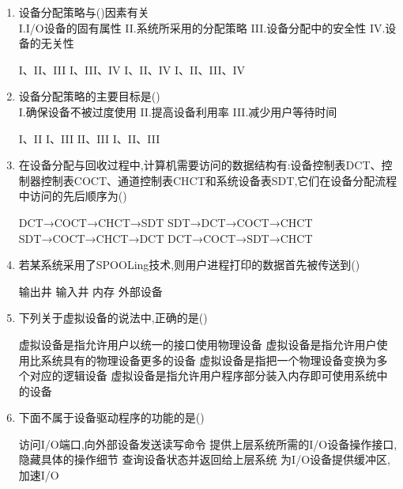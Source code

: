 \documentclass[12pt, a4paper, oneside, UTF8]{ctexbook}
\begin{document}
\begin{enumerate}
    \item 设备分配策略与(\qquad)因素有关\\
    I.I/O设备的固有属性\quad
    II.系统所采用的分配策略\quad
    III.设备分配中的安全性\quad
    IV.设备的无关性
    \begin{choices}[2]
    \task I、II、III
    \task I、III、IV
    \task I、II、IV
    \task I、II、III、IV
    \end{choices}

    \item 设备分配策略的主要目标是(\qquad)\\
    I.确保设备不被过度使用\quad
    II.提高设备利用率\quad
    III.减少用户等待时间
    \begin{choices}[2]
    \task I、II
    \task I、III
    \task II、III
    \task I、II、III
    \end{choices}

    \item 在设备分配与回收过程中,计算机需要访问的数据结构有:设备控制表DCT、控制器控制表COCT、通道控制表CHCT和系统设备表SDT,它们在设备分配流程中访问的先后顺序为(\qquad)
    \begin{choices}[2]
    \task DCT→COCT→CHCT→SDT
    \task SDT→DCT→COCT→CHCT
    \task SDT→COCT→CHCT→DCT
    \task DCT→COCT→SDT→CHCT
    \end{choices}

    \item 若某系统采用了SPOOLing技术,则用户进程打印的数据首先被传送到(\qquad)
    \begin{choices}
    \task 输出井
    \task 输入井
    \task 内存
    \task 外部设备
    \end{choices}

    \item 下列关于虚拟设备的说法中,正确的是(\qquad)
    \begin{choices}[1]
    \task 虚拟设备是指允许用户以统一的接口使用物理设备
    \task 虚拟设备是指允许用户使用比系统具有的物理设备更多的设备
    \task 虚拟设备是指把一个物理设备变换为多个对应的逻辑设备
    \task 虚拟设备是指允许用户程序部分装入内存即可使用系统中的设备
    \end{choices}

    \item 下面不属于设备驱动程序的功能的是(\qquad)
    \begin{choices}[1]
    \task 访问I/O端口,向外部设备发送读写命令
    \task 提供上层系统所需的I/O设备操作接口,隐藏具体的操作细节
    \task 查询设备状态并返回给上层系统
    \task 为I/O设备提供缓冲区,加速I/O
    \end{choices}


\end{enumerate}
\end{document}
